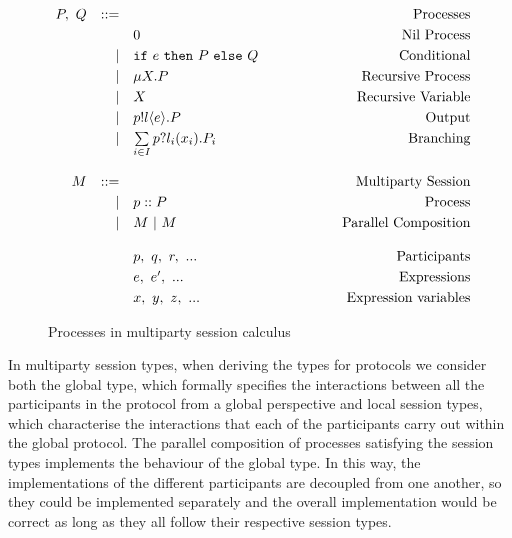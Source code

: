 \documentclass[12pt,twoside]{report}
\newcommand{\white}{\ \ \ \ \ \ \ \ \ \ \ \ }
\begin{document}
\begin{figure}[h]
    \centering
    \begin{equation*}
    \centering
    \begin{array}{rrlcr}
        P,\ Q & ::= && \white & \text{Processes} \\[2.75pt]
             &   & 0 & \white & \text{Nil\ Process}  \\[2.75pt]
             
             & | & \texttt{if}\ e\ \texttt{then}\ P\ \texttt{else}\ Q & \white & \text{Conditional} \\[2.75pt]
             & | & \mu X.P & \white  & \text{Recursive}\ \text{Process} \\[2.75pt]
             & | & X & \white  & \text{Recursive\ Variable}\\[2.75pt]
             & | & p!l \langle e \rangle.P & \white & \text{Output} \\[2.75pt]
             & | & \sum\limits_{i \in I} p?l_i(x_i).P_i & \white & \text{Branching} \\\\

        M & ::= &&& \text{Multiparty\ Session}\\[2.75pt]
        & | & p :: P\ & \white & \text{Process}\\[2.75pt]
        & | & M\ |\ M\ & \white & \text{Parallel\ Composition}\\\\
        
        &&p,\ q,\ r,\ ... & \white & \text{Participants}\\[2.75pt]
        &&e,\ e',\ ... & \white & \text{Expressions}\\[2.75pt]
        &&x,\ y,\ z,\ ... & \white & \text{Expression\  variables}
        \end{array}
    \end{equation*}
    \caption{Processes in multiparty session calculus}
    \label{MPST_processes}
\end{figure}{}

In multiparty session types, when deriving the types for protocols we consider both the global type, which formally specifies the interactions between all the participants in the protocol from a global perspective and local session types, which characterise the interactions that each of the participants carry out within the global protocol. The parallel composition of processes satisfying the session types implements the behaviour of the global type. In this way, the implementations of the different participants are decoupled from one another, so they could be implemented separately and the overall implementation would be correct as long as they all follow their respective session types.\\
\end{document}
